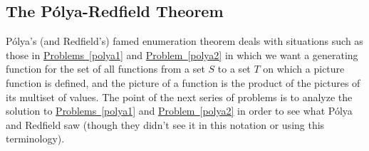 \documentclass[10pt,]{book}
\theoremstyle{plain}
\theoremstyle{definition}
\theoremstyle{definition}
\numberwithin{equation}{chapter}
\begin{document}
\subsection[{The Pólya-Redfield Theorem}]{The Pólya-Redfield Theorem}\label{subsection-61}
Pólya's (and Redfield's) famed enumeration theorem deals with situations such as those in \hyperref[polya1]{Problems~\ref{polya1}} and \hyperref[polya2]{Problem~\ref{polya2}} in which we want a generating function for the set of all functions from a set \(S\) to a set \(T\) on which a picture function is defined, and the picture of a function is the product of the pictures of its multiset of values. The point of the next series of problems is to analyze the solution to \hyperref[polya1]{Problems~\ref{polya1}} and \hyperref[polya2]{Problem~\ref{polya2}} in order to see what Pólya and Redfield saw (though they didn't see it in this notation or using this terminology).%
\end{document}
